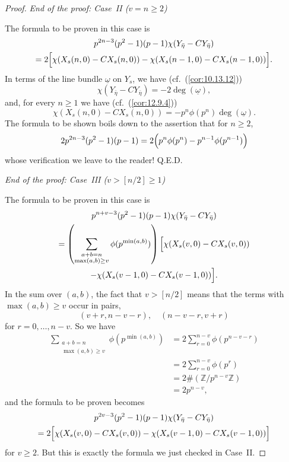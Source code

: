 \begin{proof}
\kmitem\label{item:14.5.15} \emph{End of the proof: Case~II ($v = n \ge 2$)}

The formula to be proven in this case is
\begin{multline*}
p^{2n-3}(p^2-1)(p-1) \chi(Y_{\bar{\eta}} - CY_{\bar{\eta}}) \\
= 2 \Bigl[ \chi(X_s(n,0) - CX_s(n,0)) - \chi(X_s(n-1,0) - CX_s(n-1,0)) \Bigr] .
\end{multline*}
In terms of the line bundle $\underline{\omega}$ on $Y_s$, we have (cf.~(\ref{cor:10.13.12}))
\[
\chi(Y_{\bar{\eta}} - CY_{\bar{\eta}}) = -2 \deg(\underline{\omega}) ,
\]
and, for every $n \ge 1$ we have (cf.~(\ref{cor:12.9.4}))
\[
\chi(X_s(n,0) - CX_s(n,0)) = -p^n \phi(p^n) \deg(\underline{\omega}) .
\]
The formula to be shown boils down to the assertion that for $n \ge 2$,
\[
2 p^{2n-3}(p^2-1)(p-1) = 2 \Bigl( p^n \phi(p^n) - p^{n-1} \phi(p^{n-1}) \Bigr)
\]
whose verification we leave to the reader! Q.E.D.

\kmitem\label{item:14.5.16} \emph{End of the proof: Case~III ($v > [n/2] \ge 1$)}

The formula to be proven in this case is
\begin{multline*}
p^{n+v-3}(p^2-1)(p-1) \chi(Y_{\bar{\eta}} - CY_{\bar{\eta}}) \\
= \left( \sum_{\substack{a+b=n \\ \max(a,b) \ge v}} \phi(p^{\min(a,b)}) \right) \Bigl[ \chi(X_s(v,0) - CX_s(v,0)) \\
- \chi(X_s(v-1,0) - CX_s(v-1,0)) \Bigr] .
\end{multline*}
In the sum over $(a,b)$, the fact that $v > [n/2]$ means that the terms with $\max(a,b) \ge v$ occur in pairs,
\[
(v+r, n-v-r), \quad (n-v-r, v+r)
\]
for $r = 0, \dots, n-v$. So we have
\begin{align*}
\sum_{\substack{a+b=n \\ \max(a,b) \ge v}} \phi(p^{\min(a,b)}) &= 2 \sum_{r=0}^{n-v} \phi(p^{n-v-r}) \\
&= 2 \sum_{r=0}^{n-v} \phi(p^r) \\
&= 2 \#(\mathbb{Z}/p^{n-v}\mathbb{Z}) \\
&= 2 p^{n-v} ,
\end{align*}
and the formula to be proven becomes
\begin{multline*}
p^{2v-3}(p^2-1)(p-1) \chi(Y_{\bar{\eta}} - CY_{\bar{\eta}}) \\
= 2 \Bigl[ \chi(X_s(v,0) - CX_s(v,0)) - \chi(X_s(v-1,0) - CX_s(v-1,0)) \Bigr]
\end{multline*}
for $v \ge 2$. But this is exactly the formula we just checked in Case~II.
\end{proof}

